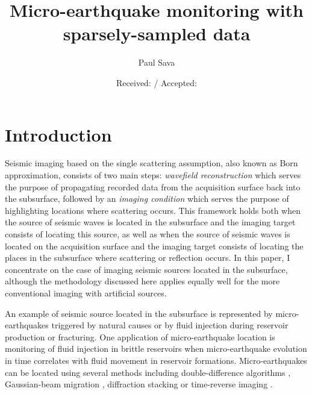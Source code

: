 


\def\xh{ {{\x}_h} }
\def\yh{ {{\y}_h} }
\def\th{ {{\t}_h} }

\def\geosout#1{}
\def\geouline#1{#1}


\author{Paul Sava}
\title{Micro-earthquake monitoring with sparsely-sampled data}
\date{Received: / Accepted:}
\maketitle



\section{Introduction}

Seismic imaging based on the single scattering assumption, also known
as Born approximation, consists of two main steps: \textit{wavefield
  reconstruction} which serves the purpose of propagating recorded
data from the acquisition surface back into the subsurface, followed
by an \textit{imaging condition} which serves the purpose of
highlighting locations where scattering occurs.
%
This framework holds both when the source of seismic waves is located
in the subsurface and the imaging target consists of locating this
source, as well as when the source of seismic waves is located on the
acquisition surface and the imaging target consists of locating the
places in the subsurface where scattering or reflection occurs. In
this paper, I concentrate on the case of imaging seismic sources
located in the subsurface, although the methodology discussed here
applies equally well for the more conventional imaging with artificial
sources.

An example of seismic source located in the subsurface is represented
by micro-earthquakes triggered by natural causes or by fluid injection
during reservoir production or fracturing. One application of
micro-earthquake location is monitoring of fluid injection in brittle
reservoirs when micro-earthquake evolution in time correlates with
fluid movement in reservoir formations.  Micro-earthquakes can be
located using several methods including double-difference algorithms
\cite[]{WaldhauserEllsworth:2000}, Gaussian-beam migration
\cite[]{SEG-2004-03540357,rentsch:S33}, diffraction stacking
\cite[]{Gajewski:2007} or \geosout{reverse-time migration}
\geouline{time-reverse imaging} \cite[]{Gajewski:2005,Artman.meq}.


